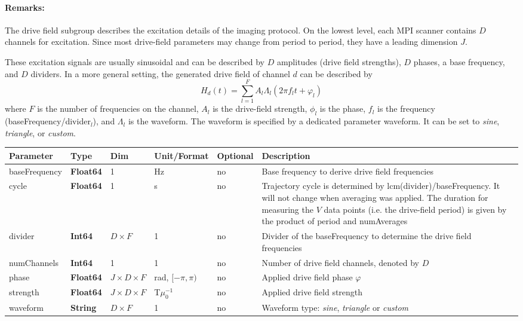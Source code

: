 \documentclass[landscape,a4paper]{article} %
\newcommand{\inltab}[1]{{\ttfamily\bfseries\color{blue}#1}}
\newcommand{\inlvar}[1]{{\ttfamily#1}}
\begin{document}
\begin{multicols}{2}
\paragraph{Remarks:} The drive field subgroup describes the excitation details of the imaging protocol. On the lowest level, each MPI scanner contains $D$ channels for excitation. Since most drive-field parameters may change from period to period, they have a leading dimension $J$.

These excitation signals are usually sinusoidal and can be described by $D$ amplitudes (drive field strengths), $D$ phases, a base frequency, and $D$ dividers. In a more general setting, the generated drive field of channel $d$ can be described by
$$
H_d(t) = \sum_{l=1}^{F} A_l \Lambda_l (2\pi f_l t + \varphi_l)
$$
where $F$ is the number of frequencies on the channel, $A_l$ is the drive-field strength, $\phi_l$ is the phase, $f_l$ is the frequency (\inlvar{baseFrequency}/\inlvar{divider}$_l$), and $\Lambda_l$ is the waveform. The waveform is specified by a dedicated parameter \inlvar{waveform}. It can be set to \textit{sine}, \textit{triangle}, or \textit{custom}. 
\end{multicols}

\noindent \begin{tabularx}{\columnwidth}{lllllX} 
\textbf{Parameter} & \textbf{Type} & \textbf{Dim} & \textbf{Unit/Format} & \textbf{Optional} & \textbf{Description} \\ \hline 
\inlvar{baseFrequency} & \inltab{Float64} & 1 & Hz & no & Base frequency to derive drive field frequencies \\ \hline
\inlvar{cycle} & \inltab{Float64} & 1 & s & no & Trajectory cycle is determined by lcm(\inlvar{divider})/\inlvar{baseFrequency}. It will not change when averaging was applied. The duration for measuring the $V$ data points (i.e. the drive-field period) is given by the product of  \inlvar{period} and \inlvar{numAverages} \\ \hline
\inlvar{divider} & \inltab{Int64} & $D \times F$ & 1 & no & Divider of the \inlvar{baseFrequency} to determine the drive field frequencies \\ \hline
\inlvar{numChannels} & \inltab{Int64} & 1 & 1 & no & Number of drive field channels, denoted by $D$ \\ \hline
\inlvar{phase} & \inltab{Float64} & $J \times D \times F$ & rad, $[-\pi,\pi)$ & no & Applied drive field phase $\varphi$\\ \hline
\inlvar{strength} & \inltab{Float64} & $J \times D \times F $ & T$\mu_0^{-1}$ & no & Applied drive field strength \\ \hline
\inlvar{waveform} & \inltab{String} & $D \times F$ & 1 & no & Waveform type: \textit{sine}, \textit{triangle} or \textit{custom} \\ \hline
\end{tabularx}
\end{document}
